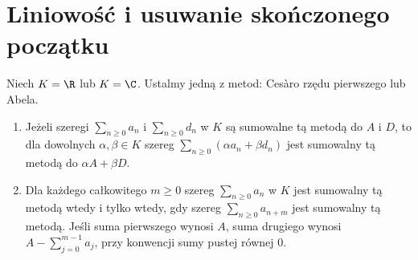 \begin{center}
\end{center}

\section{Liniowość i usuwanie skończonego początku}
\begin{twierdzenie}
\label{ma1:thm:summability-linear-shift}
Niech $K=\R$ lub $K=\C$. Ustalmy jedną z metod: Cesàro rzędu pierwszego lub Abela.
\begin{enumerate}[label=(\roman*)]
\item Jeżeli szeregi $\sum_{n\ge0}a_n$ i $\sum_{n\ge0}d_n$ w $K$ są sumowalne tą metodą do $A$ i $D$, to dla dowolnych $\alpha,\beta\in K$ szereg $\sum_{n\ge0}(\alpha a_n+\beta d_n)$ jest sumowalny tą metodą do $\alpha A+\beta D$.
\item Dla każdego całkowitego $m\ge0$ szereg $\sum_{n\ge0}a_n$ w $K$ jest sumowalny tą metodą wtedy i tylko wtedy, gdy szereg $\sum_{n\ge0}a_{n+m}$ jest sumowalny tą metodą. Jeśli suma pierwszego wynosi $A$, suma drugiego wynosi $A-\sum_{j=0}^{m-1}a_j$, przy konwencji sumy pustej równej $0$.
\end{enumerate}
\end{twierdzenie}
